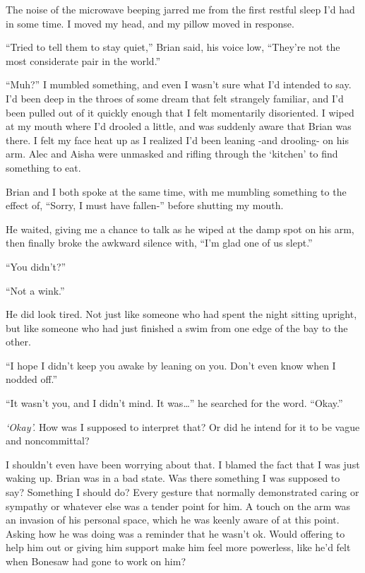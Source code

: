 





The noise of the microwave beeping jarred me from the first restful sleep I'd had in some time.  I moved my head, and my pillow moved in response.



``Tried to tell them to stay quiet,'' Brian said, his voice low, ``They're not the most considerate pair in the world.''



``Muh?'' I mumbled something, and even I wasn't sure what I'd intended to say.  I'd been deep in the throes of some dream that felt strangely familiar, and I'd been pulled out of it quickly enough that I felt momentarily disoriented.  I wiped at my mouth where I'd drooled a little, and was suddenly aware that Brian was there.  I felt my face heat up as I realized I'd been leaning -and drooling- on his arm.  Alec and Aisha were unmasked and rifling through the `kitchen' to find something to eat.



Brian and I both spoke at the same time, with me mumbling something to the effect of, ``Sorry, I must have fallen-'' before shutting my mouth.



He waited, giving me a chance to talk as he wiped at the damp spot on his arm, then finally broke the awkward silence with,  ``I'm glad one of us slept.''



``You didn't?''



``Not a wink.''



He did look tired.  Not just like someone who had spent the night sitting upright, but like someone who had just finished a swim from one edge of the bay to the other.



``I hope I didn't keep you awake by leaning on you.  Don't even know when I nodded off.''



``It wasn't you, and I didn't mind.  It was\ldots'' he searched for the word.  ``Okay.''



\emph{`Okay'.}  How was I supposed to interpret that?  Or did he intend for it to be vague and noncommittal?



I shouldn't even have been worrying about that.  I blamed the fact that I was just waking up.  Brian was in a bad state.  Was there something I was supposed to say?  Something I should do?  Every gesture that normally demonstrated caring or sympathy or whatever else was a tender point for him.  A touch on the arm was an invasion of his personal space, which he was keenly aware of at this point.  Asking how he was doing was a reminder that he wasn't ok.  Would offering to help him out or giving him support make him feel more powerless, like he'd felt when Bonesaw had gone to work on him?




